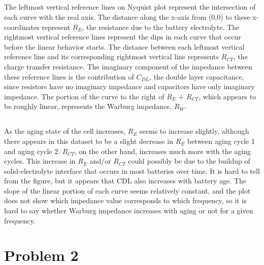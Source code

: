 \documentclass[a4paper,12pt]{extarticle}
\begin{document}
\pagebreak

\subsection{}

The leftmost vertical reference lines on Nyquist plot represent the intersection of each curve with the real axis. The distance along the x-axis from (0,0) to these x-coordinates represent \(R_E\), the resistance due to the battery electrolyte. The rightmost vertical reference lines represent the dips in each curve that occur before the linear behavior starts. The distance between each leftmost vertical reference line and its corresponding rightmost vertical line represents \(R_{CT}\), the charge transfer resistance. The imaginary component of the impedance between these reference lines is the contribution of \(C_{DL}\), the double layer capacitance, since resistors have no imaginary impedance and capacitors have only imaginary impedance. The portion of the curve to the right of \(R_E\) + \(R_{CT}\), which appears to be roughly linear, represents the Warburg impedance, \(R_W\). 

\subsection{}

As the aging state of the cell increases, \(R_E\) seems to increase slightly, although there appears in this dataset to be a slight decrease in \(R_E\) between aging cycle 1 and aging cycle 2. \(R_{CT}\), on the other hand, increases much more with the aging cycles. This increase in \(R_E\) and/or \(R_{CT}\) could possibly be due to the buildup of solid-electrolyte interface that occurs in most batteries over time. It is hard to tell from the figure, but it appears that CDL also increases with battery age. The slope of the linear portion of each curve seems relatively constant, and the plot does not show which impedance value corresponds to which frequency, so it is hard to say whether Warburg impedance increases with aging or not for a given frequency.

\section{Problem 2}

\subsection{}
\end{document}
